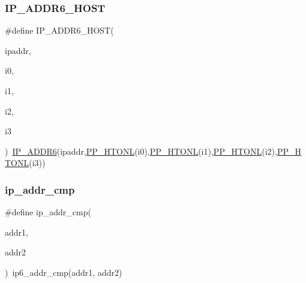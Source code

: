 \mbox{\label{openmote-cc2538_2lwip_2src_2include_2lwip_2ip__addr_8h_abfb1ce44d6a8791336bf3ac06aa086ca}} 
\subsubsection{\texorpdfstring{I\+P\+\_\+\+A\+D\+D\+R6\+\_\+\+H\+O\+ST}{IP\_ADDR6\_HOST}}
{\footnotesize\ttfamily \#define I\+P\+\_\+\+A\+D\+D\+R6\+\_\+\+H\+O\+ST(\begin{DoxyParamCaption}\item[{}]{ipaddr,  }\item[{}]{i0,  }\item[{}]{i1,  }\item[{}]{i2,  }\item[{}]{i3 }\end{DoxyParamCaption})~\hyperlink{openmote-cc2538_2lwip_2src_2include_2lwip_2ip__addr_8h_a9ee53b601b89dcb517496ba0bccf9bd0}{I\+P\+\_\+\+A\+D\+D\+R6}(ipaddr,\hyperlink{openmote-cc2538_2lwip_2src_2include_2lwip_2def_8h_afea9c21aa1f56180cdf6fb42ef14a294}{P\+P\+\_\+\+H\+T\+O\+NL}(i0),\hyperlink{openmote-cc2538_2lwip_2src_2include_2lwip_2def_8h_afea9c21aa1f56180cdf6fb42ef14a294}{P\+P\+\_\+\+H\+T\+O\+NL}(i1),\hyperlink{openmote-cc2538_2lwip_2src_2include_2lwip_2def_8h_afea9c21aa1f56180cdf6fb42ef14a294}{P\+P\+\_\+\+H\+T\+O\+NL}(i2),\hyperlink{openmote-cc2538_2lwip_2src_2include_2lwip_2def_8h_afea9c21aa1f56180cdf6fb42ef14a294}{P\+P\+\_\+\+H\+T\+O\+NL}(i3))}

\mbox{\label{openmote-cc2538_2lwip_2src_2include_2lwip_2ip__addr_8h_a008c9c92d770cc030ea054e6b259835a}} 
\subsubsection{\texorpdfstring{ip\+\_\+addr\+\_\+cmp}{ip\_addr\_cmp}}
{\footnotesize\ttfamily \#define ip\+\_\+addr\+\_\+cmp(\begin{DoxyParamCaption}\item[{}]{addr1,  }\item[{}]{addr2 }\end{DoxyParamCaption})~ip6\+\_\+addr\+\_\+cmp(addr1, addr2)}


